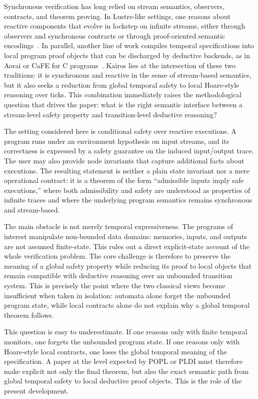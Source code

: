 \documentclass[11pt,a4paper]{article}
\begin{document}
Synchronous verification has long relied on stream semantics, observers,
contracts, and theorem proving. In Lustre-like settings, one reasons about
reactive components that evolve in lockstep on infinite streams, either through
observers and synchronous contracts or through proof-oriented semantic
encodings~\cite{halbwachs-1991,benveniste-sync,lustre-pvs,agree-techreport,agree-observers,kind2-realizability,cocospec}.
In parallel, another line of work compiles temporal specifications into local
program proof objects that can be discharged by deductive backends, as in
Aorai or CaFE for C programs~\cite{aorai-manual,stouls-groslambert-2009,cafe-page}.
Kairos lies at the intersection of these two traditions: it is synchronous and
reactive in the sense of stream-based semantics, but it also seeks a reduction
from global temporal safety to local Hoare-style reasoning over ticks. This
combination immediately raises the methodological question that drives the
paper: what is the right semantic interface between a stream-level safety
property and transition-level deductive reasoning?

The setting considered here is conditional safety over reactive executions. A
program runs under an environment hypothesis on input streams, and its
correctness is expressed by a safety guarantee on the induced input/output
trace. The user may also provide node invariants that capture additional facts
about executions. The resulting statement is neither a plain state invariant nor
a mere operational contract: it is a theorem of the form ``admissible inputs
imply safe executions,'' where both admissibility and safety are understood as
properties of infinite traces and where the underlying program semantics
remains synchronous and stream-based.

The main obstacle is not merely temporal expressiveness. The programs of
interest manipulate non-bounded data domains: memories, inputs, and outputs are
not assumed finite-state. This rules out a direct explicit-state account of the
whole verification problem. The core challenge is therefore to preserve the
meaning of a global safety property while reducing its proof to local objects
that remain compatible with deductive reasoning over an unbounded transition
system. This is precisely the point where the two classical views become
insufficient when taken in isolation: automata alone forget the unbounded
program state, while local contracts alone do not explain why a global temporal
theorem follows.

This question is easy to underestimate. If one reasons only with finite
temporal monitors, one forgets the unbounded program state. If one reasons only
with Hoare-style local contracts, one loses the global temporal meaning of the
specification. A paper at the level expected by POPL or PLDI must therefore
make explicit not only the final theorem, but also the exact semantic path from
global temporal safety to local deductive proof objects. This is the role of
the present development.
\end{document}
